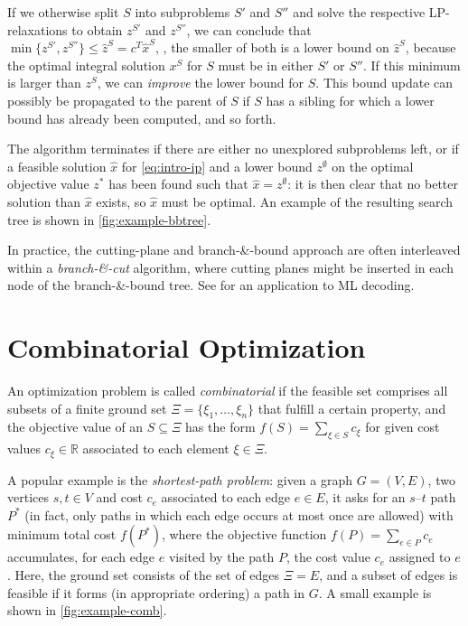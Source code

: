 If we otherwise split $S$ into subproblems $S'$ and $S''$ and solve the respective LP-relaxations to obtain $z^{S'}$ and $z^{S''}$, we can conclude that $\min\{z^{S'}, z^{S''}\} ≤ \hat z^S = c^T \hat x^S$, \ie, the smaller of both is a lower bound on $\hat z^S$, because the optimal integral solution $x^S$ for $S$ must be in either $S'$ or $S''$. If this minimum is larger than $z^S$, we can \emph{improve} the lower bound for $S$. This bound update can possibly be propagated to the parent of $S$ if $S$ has a sibling for which a lower bound has already been computed, and so forth.

The algorithm terminates if there are either no unexplored subproblems left, or if a feasible solution $\hat x$ for \cref{eq:intro-ip} and a lower bound $z^∅$ on the optimal objective value $z^*$ has been found such that $\hat x = z^∅$: it is then clear that no better solution than $\hat x$ exists, so $\hat x$ must be optimal. An example of the resulting search tree is shown in \cref{fig:example-bbtree}.

In practice, the cutting-plane and branch-\&-bound approach are often interleaved within a \emph{branch-\&-cut} algorithm, where cutting planes might be inserted in each node of the branch-\&-bound tree. See \eg \cite{Helmling+14MLDecoding} for an application to ML decoding.

\section{Combinatorial Optimization}
\label{sec:intro-combopt}
An optimization problem is called \emph{combinatorial} if the feasible set comprises all subsets of a finite ground set $Ξ = \{ξ_1,\dotsc,ξ_n\}$ that fulfill a certain property, and the objective value of an $S ⊆ Ξ$ has the form $f(S) = \sum_{ξ ∈ S} c_ξ$ for given cost values $c_ξ ∈ ℝ$ associated to each element $ξ ∈ Ξ$.

A popular example is the \emph{shortest-path problem}: given a graph $G=(V,E)$, two vertices $s,t ∈ V$ and cost $c_e$ associated to each edge $e ∈ E$, it asks for an $s$–$t$ path $P^*$ (in fact, only paths in which each edge occurs at most once are allowed) with minimum total cost $f(P^*)$, where the objective function $f(P) = \sum_{e ∈ P} c_e$ accumulates, for each edge $e$ visited by the path $P$, the cost value $c_e$ assigned to $e$. Here, the ground set consists of the set of edges $Ξ=E$, and a subset of edges is feasible if it forms (in appropriate ordering) a path in $G$. A small example is shown in \cref{fig:example-comb}.

